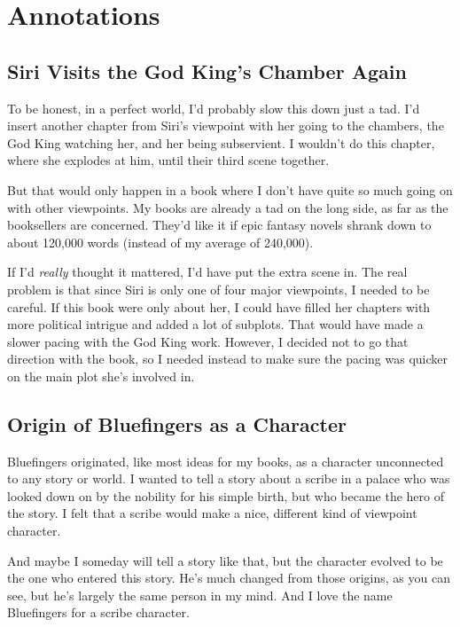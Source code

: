 \section*{Annotations}

\subsection*{Siri Visits the God King’s Chamber Again}

To be honest, in a perfect world, I’d probably slow this down just a tad. I’d insert another chapter from Siri’s viewpoint with her going to the chambers, the God King watching her, and her being subservient. I wouldn’t do this chapter, where she explodes at him, until their third scene together.

But that would only happen in a book where I don’t have quite so much going on with other viewpoints. My books are already a tad on the long side, as far as the booksellers are concerned. They’d like it if epic fantasy novels shrank down to about 120,000 words (instead of my average of 240,000).

If I’d \textit{really} thought it mattered, I’d have put the extra scene in. The real problem is that since Siri is only one of four major viewpoints, I needed to be careful. If this book were only about her, I could have filled her chapters with more political intrigue and added a lot of subplots. That would have made a slower pacing with the God King work. However, I decided not to go that direction with the book, so I needed instead to make sure the pacing was quicker on the main plot she’s involved in.

\subsection*{Origin of Bluefingers as a Character}

Bluefingers originated, like most ideas for my books, as a character unconnected to any story or world. I wanted to tell a story about a scribe in a palace who was looked down on by the nobility for his simple birth, but who became the hero of the story. I felt that a scribe would make a nice, different kind of viewpoint character.

And maybe I someday will tell a story like that, but the character evolved to be the one who entered this story. He’s much changed from those origins, as you can see, but he’s largely the same person in my mind. And I love the name Bluefingers for a scribe character.

